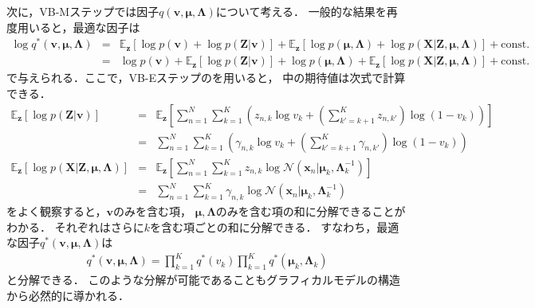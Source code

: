 次に，VB-Mステップでは因子$q(\bm{v},\bm\mu,\bm\Lambda)$について考える．
一般的な結果を再度用いると，最適な因子は
\begin{eqnarray}
 \log q^*(\bm{v},\bm\mu,\bm\Lambda)
 &=& \mathbb{E}_{\bm{z}}
  \left[\log p(\bm{v}) + \log p(\bm{Z}|\bm{v})\right]
  + \mathbb{E}_{\bm{z}}
  \left[\log p(\bm\mu,\bm\Lambda) + \log p(\bm{X}|\bm{Z},\bm\mu,\bm\Lambda)\right]
  + \mbox{const.} 
 \nonumber\\
 &=& \log p(\bm{v})
  + \mathbb{E}_{\bm{z}}\left[\log p(\bm{Z}|\bm{v})\right] 
  + \log p(\bm\mu,\bm\Lambda)
  + \mathbb{E}_{\bm{z}}
  \left[\log p(\bm{X}|\bm{Z},\bm\mu,\bm\Lambda)\right]
  + \mbox{const.}
  \label{eq:qpiphitaumulambda}
\end{eqnarray}
で与えられる．ここで，VB-Eステップのを用いると，
中の期待値は次式で計算できる．
\begin{eqnarray}
 \mathbb{E}_{\bm{z}}\left[\log p(\bm{Z}|\bm{v})\right] 
  &=& \mathbb{E}_{\bm{z}}
   \left[\sum_{n=1}^{N}\sum_{k=1}^{K}
   \left(
   z_{n,k} \log v_k + \left(\sum_{k'=k+1}^{K} z_{n,k'} \right) \log (1 - v_k)
   \right)
   \right]
   \nonumber\\
  &=& \sum_{n=1}^{N}\sum_{k=1}^{K}
   \left(
   \gamma_{n,k} \log v_k
   + \left(\sum_{k'=k+1}^{K} \gamma_{n,k'} \right) \log (1 - v_k)
   \right)
   \\
 \mathbb{E}_{\bm{z}}\left[\log p(\bm{X}|\bm{Z},\bm\mu,\bm\Lambda)\right] 
  &=& \mathbb{E}_{\bm{z}}
   \left[\sum_{n=1}^{N}\sum_{k=1}^{K}
   z_{n,k}
   \log \mathcal{N}\left(\bm{x}_{n}\big|\bm\mu_{k},\bm\Lambda_{k}^{-1}\right)
   \right]
   \nonumber\\
  &=& \sum_{n=1}^{N}\sum_{k=1}^{K}
   \gamma_{n,k}
   \log \mathcal{N}
   \left(\bm{x}_{n}\big|\bm\mu_{k},\bm\Lambda_{k}^{-1}\right)
\end{eqnarray}
をよく観察すると，$\bm{v}$のみを含む項，
$\bm\mu,\bm\Lambda$のみを含む項の和に分解できることがわかる．
それぞれはさらに$k$を含む項ごとの和に分解できる．
すなわち，最適な因子$q^*(\bm{v},\bm\mu,\bm\Lambda)$は
\begin{eqnarray}
 q^*(\bm{v},\bm\mu,\bm\Lambda)
  = 
  \prod_{k=1}^{K} q^*(v_k) 
  \prod_{k=1}^{K} q^*(\bm\mu_{k},\bm\Lambda_{k})
  \label{eq:qqq}
\end{eqnarray}
と分解できる．
このような分解が可能であることもグラフィカルモデルの構造から必然的に導かれる．

